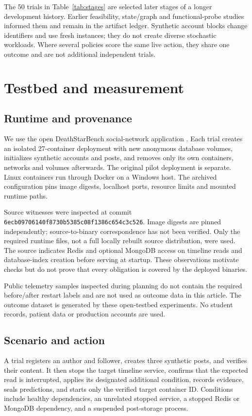 \documentclass[11pt]{article}
\begin{document}
The 50 trials in Table~\ref{tab:stages} are selected later stages of a longer development history. Earlier feasibility, state/graph and functional-probe studies informed them and remain in the artifact ledger. Synthetic account blocks change identifiers and use fresh instances; they do not create diverse stochastic workloads. Where several policies score the same live action, they share one outcome and are not additional independent trials.

\section{Testbed and measurement}
\subsection{Runtime and provenance}
We use the open DeathStarBench social-network application \cite{dsb}. Each trial creates an isolated 27-container deployment with new anonymous database volumes, initializes synthetic accounts and posts, and removes only its own containers, networks and volumes afterwards. The original pilot deployment is separate. Linux containers run through Docker on a Windows host. The archived configuration pins image digests, localhost ports, resource limits and mounted runtime paths.

Source witnesses were inspected at commit \texttt{6ecb09706140f8730b5385c08f1386c654c3c526}. Image digests are pinned independently; source-to-binary correspondence has not been verified. Only the required runtime files, not a full locally rebuilt source distribution, were used. The source indicates Redis and optional MongoDB access on timeline reads and database-index creation before serving at startup. These observations motivate checks but do not prove that every obligation is covered by the deployed binaries.

Public telemetry samples inspected during planning do not contain the required before/after restart labels and are not used as outcome data in this article. The outcome dataset is generated by these open-testbed experiments. No student records, patient data or production accounts are used.

\subsection{Scenario and action}
A trial registers an author and follower, creates three synthetic posts, and verifies their content. It then stops the target timeline service, confirms that the expected read is interrupted, applies its designated additional condition, records evidence, seals predictions, and starts only the verified target container ID. Conditions include healthy dependencies, an unrelated stopped service, a stopped Redis or MongoDB dependency, and a suspended post-storage process.
\end{document}
